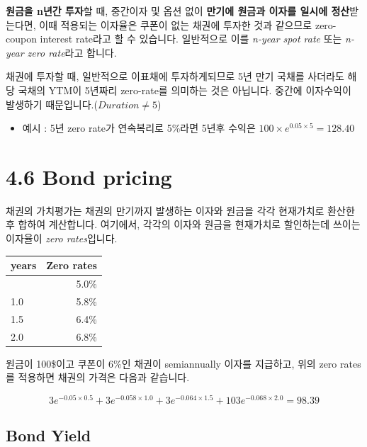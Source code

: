 \documentclass[
  letterpaper,
  DIV=11,
  numbers=noendperiod]{scrreprt}
\providecommand{\tightlist}{%
  \setlength{\itemsep}{0pt}\setlength{\parskip}{0pt}}\usepackage{longtable,booktabs,array}
\begin{document}

\textbf{원금을 n년간 투자}할 때, 중간이자 및 옵션 없이 \textbf{만기에
원금과 이자를 일시에 정산}받는다면, 이때 적용되는 이자율은 쿠폰이 없는
채권에 투자한 것과 같으므로 zero-coupon interest rate라고 할 수
있습니다. 일반적으로 이를 \emph{n-year spot rate} 또는 \emph{n-year zero
rate}라고 합니다.

채권에 투자할 때, 일반적으로 이표채에 투자하게되므로 5년 만기 국채를
사더라도 해당 국채의 YTM이 5년짜리 zero-rate를 의미하는 것은 아닙니다.
중간에 이자수익이 발생하기 때문입니다.(\(Duration\ne 5\))

\begin{itemize}
\tightlist
\item
  예시 : 5년 zero rate가 연속복리로 5\%라면 5년후 수익은
  \(100\times e^{0.05\times 5}=128.40\)
\end{itemize}

\section*{4.6 Bond pricing}\label{bond-pricing}


채권의 가치평가는 채권의 만기까지 발생하는 이자와 원금을 각각 현재가치로
환산한 후 합하여 계산합니다. 여기에서, 각각의 이자와 원금을 현재가치로
할인하는데 쓰이는 이자율이 \emph{zero rates}입니다.

\begin{longtable}[]{@{}lr@{}}
\toprule\noalign{}
years & Zero rates \\
\midrule\noalign{}
\endhead
\bottomrule\noalign{}
\endlastfoot
0.5 & 5.0\% \\
1.0 & 5.8\% \\
1.5 & 6.4\% \\
2.0 & 6.8\% \\
\end{longtable}

원금이 100\$이고 쿠폰이 6\%인 채권이 semiannually 이자를 지급하고, 위의
zero rates를 적용하면 채권의 가격은 다음과 같습니다.

\[3e^{-0.05\times 0.5}+3e^{-0.058\times 1.0}+3e^{-0.064\times 1.5}+103e^{-0.068\times 2.0}=98.39\]

\subsection*{Bond Yield}\label{bond-yield}
\end{document}
